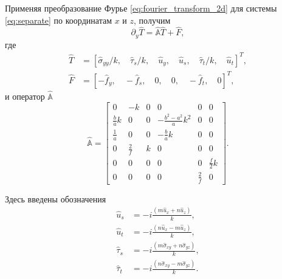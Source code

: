 Применяя преобразование Фурье \eqref{eq:fourier_transform_2d} для системы \eqref{eq:separate} по координатам $x$ и $z$, получим
\begin{equation}
    \label{eq:FT_system}
    \partial_y \hat{T} = \hat{\mathbb{A}} \hat{T} + \hat{F},
\end{equation}
где
\begin{equation}
    \label{eq:FourierT}
    \begin{split}
        \hat{T} &= \left[\hat{\sigma}_{yy}/k , \quad \hat{\tau}_s/k , \quad \hat{u}_y , \quad \hat{u}_s , \quad  \hat{\tau}_t/k , \quad  \hat{u}_t \right]^T, \\
        \hat{F} &= \left[-\hat{f}_y , \quad -\hat{f}_s , \quad 0 , \quad 0 , \quad -\hat{f}_t , \quad 0\right]^T,
    \end{split}
\end{equation}
и оператор $\hat{\mathbb{A}}$
\begin{equation}
    \label{eq:FourierA}
    \hat{\mathbb{A}} = 
    \left[\begin{array}{cccccc}
        0 & -k & 0 & 0 & 0 & 0 \\
        \frac{b}{a}k & 0 & 0 & -\frac{b^2-a^2}{a}k^2 & 0 & 0 \\
        \frac{1}{a} & 0 & 0 & -\frac{b}{a}k & 0 & 0 \\
        0 & \frac{2}{f} & k & 0 & 0 & 0 \\
        0 & 0 & 0 & 0 & 0 & \frac{f}{2}k \\
        0 & 0 & 0 & 0 & \frac{2}{f} & 0 
    \end{array}\right].
\end{equation}

Здесь введены обозначения
\begin{equation}
    \label{eq:FT_special_variables}
    \begin{split}
        \hat{u}_s & = -i \frac{(m\hat{u}_x + n\hat{u}_z)}{k}, \\
        \hat{u}_t & = -i \frac{(n\hat{u}_x - m\hat{u}_z)}{k}, \\
        \hat{\tau}_s & = -i \frac{(m\hat{\sigma}_{xy} + n\hat{\sigma}_{yz})}{k}, \\
        \hat{\tau}_t & = -i \frac{(n\hat{\sigma}_{xy} - m\hat{\sigma}_{yz})}{k}. \\
    \end{split} 
\end{equation}

